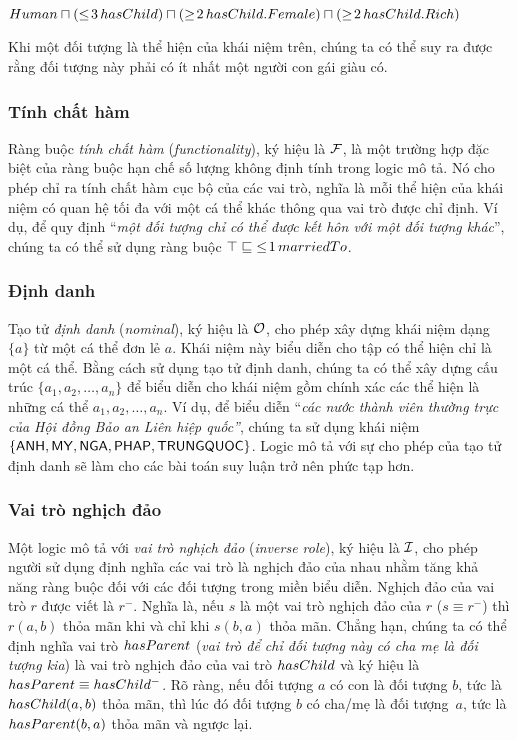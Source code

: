 $Human \sqcap (\leq\!3\,hasChild) \sqcap (\geq\!2\,hasChild.Female) \sqcap (\geq\!2\,hasChild.Rich)$

Khi một đối tượng là thể hiện của khái niệm trên, chúng ta có thể suy ra được rằng đối tượng này phải có ít nhất một người con gái giàu có.

\subsubsection{Tính chất hàm}
\label{sec:Chap1.Functionality}
Ràng buộc {\em tính chất hàm} ({\em functionality}), ký hiệu là $\mathcal{F}$, là một trường hợp đặc biệt của ràng buộc hạn chế số lượng không định tính trong logic mô tả. Nó cho phép chỉ ra tính chất hàm cục bộ của các vai trò, nghĩa là mỗi thể hiện của khái niệm có quan hệ tối đa với một cá thể khác thông qua vai trò được chỉ định.
Ví dụ, để quy định ``\textit{một đối tượng chỉ có thể được kết hôn với một đối tượng khác}'', chúng ta có thể sử dụng ràng buộc $\top \sqsubseteq\; \leq\!1\,marriedTo$.

\subsubsection{Định danh}
\label{sec:Chap1.Nominal}
Tạo tử {\em định danh} ({\em nominal}), ký hiệu là $\mathcal{O}$, cho phép xây dựng khái niệm dạng $\{a\}$ từ một cá thể đơn lẻ $a$. Khái niệm này biểu diễn cho tập có thể hiện chỉ là một cá thể. Bằng cách sử dụng tạo tử định danh, chúng ta có thể xây dựng cấu trúc $\{a_1, a_2, \ldots, a_n\}$ để biểu diễn cho khái niệm gồm chính xác các thể hiện là những cá thể $a_1, a_2, \ldots, a_n$.
Ví dụ, để biểu diễn ``\textit{các nước thành viên thường trực của Hội đồng Bảo an Liên hiệp quốc''}, chúng ta sử dụng khái niệm $\{\mathsf{ANH}, \mathsf{MY}, \mathsf{NGA}, \mathsf{PHAP}, \mathsf{TRUNGQUOC}\}$.
Logic mô tả với sự cho phép của tạo tử định danh sẽ làm cho các bài toán suy luận trở nên phức tạp hơn.

\subsubsection{Vai trò nghịch đảo}
\label{sec:Chap1.RoleInverse}
Một logic mô tả với {\em vai trò nghịch đảo} ({\em inverse role}), ký hiệu là $\mathcal{I}$, cho phép người sử dụng định nghĩa các vai trò là nghịch đảo của nhau nhằm tăng khả năng ràng buộc đối với các đối tượng trong miền biểu diễn. Nghịch đảo của vai trò $r$ được viết là $r^-$. Nghĩa là, nếu $s$ là một vai trò nghịch đảo của $r$ ($s \equiv r^-$) thì $r(a, b)$ thỏa mãn khi và chỉ khi $s(b,a)$ thỏa mãn. Chẳng hạn, chúng ta có thể định nghĩa vai trò $hasParent$ ({\em vai trò để chỉ đối tượng này có cha mẹ là đối tượng kia}) là vai trò nghịch đảo của vai trò $hasChild$ và ký hiệu là $hasParent \equiv hasChild^-$. Rõ ràng, nếu đối tượng $a$ có con là đối tượng $b$, tức là $hasChild(a,b)$ thỏa mãn, thì lúc đó đối tượng $b$ có cha/mẹ là đối tượng~$a$, tức là $hasParent(b,a)$ thỏa mãn và ngược lại.

